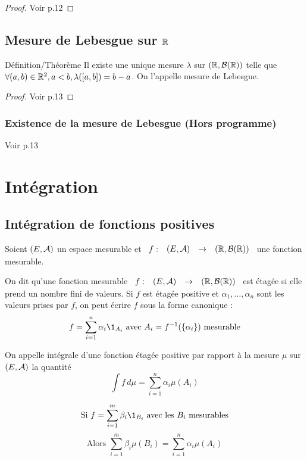 \documentclass[]{report}
\begin{document}
\begin{proof}{}{}
    Voir p.12
\end{proof}

\section{Mesure de Lebesgue sur $\mathbb{R}$}

\begin{tm}{Définition/Théorème}{}
    Il existe une unique mesure $\lambda$ sur $(\mathbb{R},\mathcal{B}(\mathbb{R}))$ telle que $\forall(a,b)\in\mathbb{R}^2,a<b,\lambda([a,b])=b-a$. On l'appelle mesure de Lebesgue.
\end{tm}

\begin{proof}{}{}
    Voir p.13
\end{proof}

\subsection*{Existence de la mesure de Lebesgue (Hors programme)}
Voir p.13

\chapter{Intégration}

\section{Intégration de fonctions positives}

Soient $(E,\mathcal{A})$ un espace mesurable et $\begin{array}{ccccc} f : & (E,\mathcal{A}) & \to & (\mathbb{R},\mathcal{B}(\mathbb{R})) \end{array}$ une fonction mesurable.

\begin{df}{}{}
    On dit qu'une fonction mesurable $\begin{array}{ccccc} f : & (E,\mathcal{A}) & \to & (\mathbb{R},\mathcal{B}(\mathbb{R})) \end{array}$ est étagée si elle prend un nombre fini de valeurs.
    Si $f$ est étagée positive et $\alpha_1,\dots,\alpha_n$ sont les valeurs prises par $f$, on peut écrire $f$ sous la forme canonique :
    $$f=\sum_{i=1}^n\alpha_i \1_{A_i} \text{ avec }A_i=f^{-1}(\{\alpha_i\})\text{ mesurable} $$
\end{df}

\begin{df}{}{}
    On appelle intégrale d'une fonction étagée positive par rapport à la mesure $\mu$ sur $(E,\mathcal{A})$ la quantité
    $$\int f\,d\mu=\sum_{i=1}^n\alpha_i \mu (A_i)$$
\end{df}

\begin{re}{}{}
    $$\text{Si }f=\sum_{i=1}^m\beta_i\1_{B_i}\text{ avec les }B_i\text{ mesurables}$$
    $$\text{Alors }\sum_{i=1}^m\beta_i\mu(B_i)=\sum_{i=1}^n\alpha_i\mu(A_i)$$
\end{re}
\end{document}
